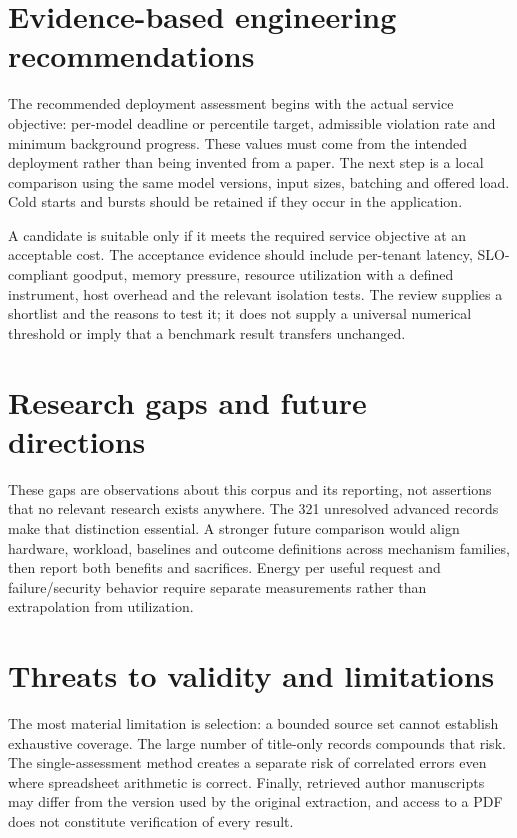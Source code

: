 \section{Evidence-based engineering recommendations}

The recommended deployment assessment begins with the actual service objective: per-model deadline or percentile target, admissible violation rate and minimum background progress. These values must come from the intended deployment rather than being invented from a paper. The next step is a local comparison using the same model versions, input sizes, batching and offered load. Cold starts and bursts should be retained if they occur in the application.

A candidate is suitable only if it meets the required service objective at an acceptable cost. The acceptance evidence should include per-tenant latency, SLO-compliant goodput, memory pressure, resource utilization with a defined instrument, host overhead and the relevant isolation tests. The review supplies a shortlist and the reasons to test it; it does not supply a universal numerical threshold or imply that a benchmark result transfers unchanged.

\section{Research gaps and future directions}

These gaps are observations about this corpus and its reporting, not assertions that no relevant research exists anywhere. The 321 unresolved advanced records make that distinction essential. A stronger future comparison would align hardware, workload, baselines and outcome definitions across mechanism families, then report both benefits and sacrifices. Energy per useful request and failure/security behavior require separate measurements rather than extrapolation from utilization.

\section{Threats to validity and limitations}

The most material limitation is selection: a bounded source set cannot establish exhaustive coverage. The large number of title-only records compounds that risk. The single-assessment method creates a separate risk of correlated errors even where spreadsheet arithmetic is correct. Finally, retrieved author manuscripts may differ from the version used by the original extraction, and access to a PDF does not constitute verification of every result.

